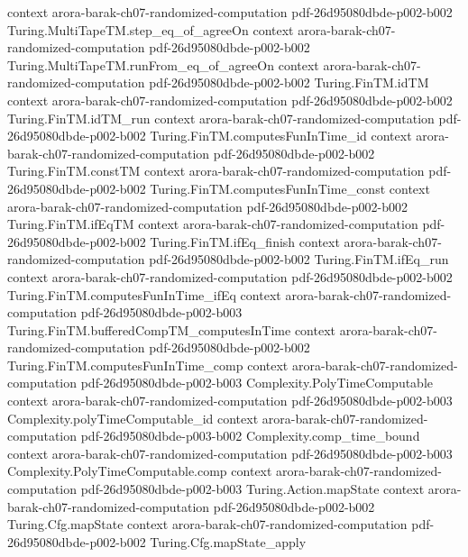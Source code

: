 \begin{theorem}
  {context}
  {arora-barak-ch07-randomized-computation}
  {pdf-26d95080dbde-p002-b002}
\proofstep
  {Turing.MultiTapeTM.step_eq_of_agreeOn}
  {context}
  {arora-barak-ch07-randomized-computation}
  {pdf-26d95080dbde-p002-b002}
\proofstep
  {Turing.MultiTapeTM.runFrom_eq_of_agreeOn}
  {context}
  {arora-barak-ch07-randomized-computation}
  {pdf-26d95080dbde-p002-b002}
\proofstep
  {Turing.FinTM.idTM}
  {context}
  {arora-barak-ch07-randomized-computation}
  {pdf-26d95080dbde-p002-b002}
\proofstep
  {Turing.FinTM.idTM_run}
  {context}
  {arora-barak-ch07-randomized-computation}
  {pdf-26d95080dbde-p002-b002}
\proofstep
  {Turing.FinTM.computesFunInTime_id}
  {context}
  {arora-barak-ch07-randomized-computation}
  {pdf-26d95080dbde-p002-b002}
\proofstep
  {Turing.FinTM.constTM}
  {context}
  {arora-barak-ch07-randomized-computation}
  {pdf-26d95080dbde-p002-b002}
\proofstep
  {Turing.FinTM.computesFunInTime_const}
  {context}
  {arora-barak-ch07-randomized-computation}
  {pdf-26d95080dbde-p002-b002}
\proofstep
  {Turing.FinTM.ifEqTM}
  {context}
  {arora-barak-ch07-randomized-computation}
  {pdf-26d95080dbde-p002-b002}
\proofstep
  {Turing.FinTM.ifEq_finish}
  {context}
  {arora-barak-ch07-randomized-computation}
  {pdf-26d95080dbde-p002-b002}
\proofstep
  {Turing.FinTM.ifEq_run}
  {context}
  {arora-barak-ch07-randomized-computation}
  {pdf-26d95080dbde-p002-b002}
\proofstep
  {Turing.FinTM.computesFunInTime_ifEq}
  {context}
  {arora-barak-ch07-randomized-computation}
  {pdf-26d95080dbde-p002-b003}
\proofstep
  {Turing.FinTM.bufferedCompTM_computesInTime}
  {context}
  {arora-barak-ch07-randomized-computation}
  {pdf-26d95080dbde-p002-b002}
\proofstep
  {Turing.FinTM.computesFunInTime_comp}
  {context}
  {arora-barak-ch07-randomized-computation}
  {pdf-26d95080dbde-p002-b003}
\proofstep
  {Complexity.PolyTimeComputable}
  {context}
  {arora-barak-ch07-randomized-computation}
  {pdf-26d95080dbde-p002-b003}
\proofstep
  {Complexity.polyTimeComputable_id}
  {context}
  {arora-barak-ch07-randomized-computation}
  {pdf-26d95080dbde-p003-b002}
\proofstep
  {Complexity.comp_time_bound}
  {context}
  {arora-barak-ch07-randomized-computation}
  {pdf-26d95080dbde-p002-b003}
\proofstep
  {Complexity.PolyTimeComputable.comp}
  {context}
  {arora-barak-ch07-randomized-computation}
  {pdf-26d95080dbde-p002-b003}
\proofstep
  {Turing.Action.mapState}
  {context}
  {arora-barak-ch07-randomized-computation}
  {pdf-26d95080dbde-p002-b002}
\proofstep
  {Turing.Cfg.mapState}
  {context}
  {arora-barak-ch07-randomized-computation}
  {pdf-26d95080dbde-p002-b002}
\proofstep
  {Turing.Cfg.mapState_apply}

\end{theorem}
